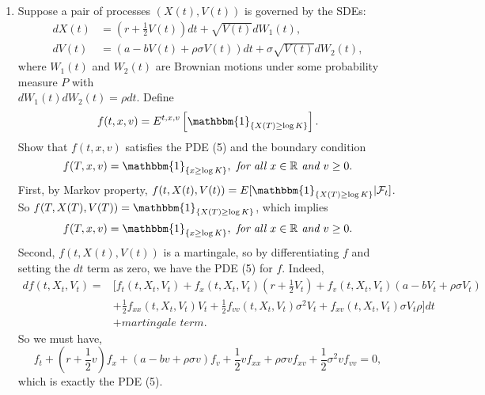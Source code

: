 \documentclass[11pt,a4,table]{article}
\begin{document}
\begin{enumerate}
\begin{enumerate}
        \item Suppose a pair of processes $(X(t), V(t))$ is governed by the SDEs:
        \begin{align}
            dX(t) &= \left(r + \frac{1}{2}V(t) \right) dt + \sqrt{V(t)} dW_1(t),\\
            dV(t) &= (a - bV(t) + \rho \sigma V(t)) dt + \sigma\sqrt{V(t)} dW_2(t),
        \end{align}
        where $W_1(t)$ and $W_2(t)$ are Brownian motions under some probability measure $P$ with \\$dW_1(t)dW_2(t) = \rho dt$. Define
        \begin{equation*}
            f(t,x,v)=E^{t,x,v}\left[\mathbbm{1}_{\{X(T)\geq \log K\}}\right].
        \end{equation*}
        Show that $f(t,x,v)$ satisfies the PDE (5) and the boundary condition
        \begin{equation*}
            f(T,x,v) = \mathbbm{1}_{\{x\geq\log K\}}, \textit{ for all } x\in \mathbb{R} \textit{ and } v\geq 0.
        \end{equation*}
\newpage
        First, by Markov property, $f(t,X(t),V(t))=E[\mathbbm{1}_{\{X(T)\geq\log K\}}|\mathcal{F}_t]$.\\
        So $f(T,X(T),V(T))=\mathbbm{1}_{\{X(T)\geq\log K\}}$, which implies
        \begin{equation*}
            f(T,x,v)=\mathbbm{1}_{\{x\geq\log K\}}, \textit{ for all } x\in\mathbb{R} \textit{ and } v\geq0.
        \end{equation*}
        Second, $f(t,X(t),V(t))$ is a martingale, so by differentiating $f$ and setting the $dt$ term as zero, we have the PDE (5) for $f$. Indeed,
        \begin{align*}
            df(t,X_t,V_t) = &\bigg[f_t(t,X_t,V_t) + f_x(t,X_t,V_t) \left(r + \frac{1}{2}V_t\right) + f_v(t,X_t,V_t) (a-bV_t+\rho\sigma V_t)\\
            &+\frac{1}{2}f_{xx}(t,X_t,V_t)V_t + \frac{1}{2}f_{vv}(t,X_t,V_t)\sigma^2V_t + f_{xv}(t,X_t,V_t)\sigma V_t\rho\bigg] dt\\
            &+\textit{martingale term.}
        \end{align*}
        So we must have,
        \begin{equation*}
            f_t + \left(r+\frac{1}{2}v\right)f_x + (a-bv+\rho\sigma v)f_v + \frac{1}{2}vf_{xx} + \rho\sigma vf_{xv} + \frac{1}{2}\sigma^2vf_{vv} = 0,
        \end{equation*}
        which is exactly the PDE (5).
        

\end{enumerate}
\end{enumerate}
\end{document}
